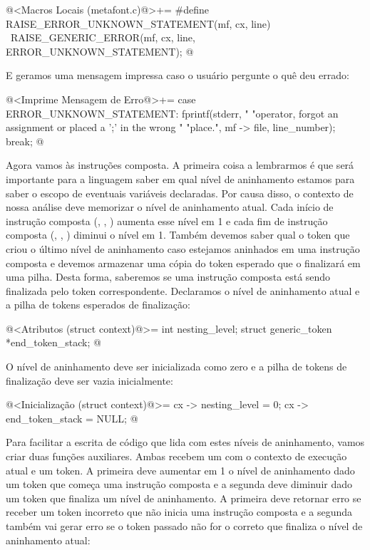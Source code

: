 \iniciocodigo
@<Macros Locais (metafont.c)@>+=
#define RAISE_ERROR_UNKNOWN_STATEMENT(mf, cx, line) {\
  RAISE_GENERIC_ERROR(mf, cx, line, ERROR_UNKNOWN_STATEMENT);}
@
\fimcodigo

E geramos uma mensagem impressa caso o usuário pergunte o quê deu
errado:

\iniciocodigo
@<Imprime Mensagem de Erro@>+=
case ERROR_UNKNOWN_STATEMENT:
  fprintf(stderr, "%
          "operator, forgot an assignment or placed a ';' in the wrong "
          "place.", mf -> file, line_number);
  break;
@
\fimcodigo

Agora vamos às instruções composta. A primeira coisa a lembrarmos é que
será importante para a linguagem saber em qual nível de aninhamento
estamos para saber o escopo de eventuais variáveis declaradas. Por
causa disso, o contexto de nossa análise deve memorizar o nível de
aninhamento atual. Cada início de instrução composta
(, , )
aumenta esse nível em 1 e cada fim de instrução composta
(, , ) diminui
o nível em 1. Também devemos saber qual o token que criou o último
nível de aninhamento caso estejamos aninhados em uma instrução
composta e devemos armazenar uma cópia do token esperado que o
finalizará em uma pilha. Desta forma, saberemos se uma instrução
composta está sendo finalizada pelo token correspondente. Declaramos o
nível de aninhamento atual e a pilha de tokens esperados de
finalização:

\iniciocodigo
@<Atributos (struct context)@>=
  int nesting_level;
  struct generic_token *end_token_stack;
@
\fimcodigo

O nível de aninhamento deve ser inicializada como zero e a pilha de
tokens de finalização deve ser vazia inicialmente:

\iniciocodigo
@<Inicialização (struct context)@>=
  cx -> nesting_level = 0;
  cx -> end_token_stack = NULL;
@
\fimcodigo

Para facilitar a escrita de código que lida com estes níveis de
aninhamento, vamos criar duas funções auxiliares. Ambas recebem
um  com o contexto de execução atual e um
token. A primeira deve aumentar em 1 o nível de aninhamento dado um
token que começa uma instrução composta e a segunda deve diminuir
dado um token que finaliza um nível de aninhamento. A primeira deve
retornar erro se receber um token incorreto que não inicia uma
instrução composta e a segunda também vai gerar erro se o token
passado não for o correto que finaliza o nível de aninhamento atual:

